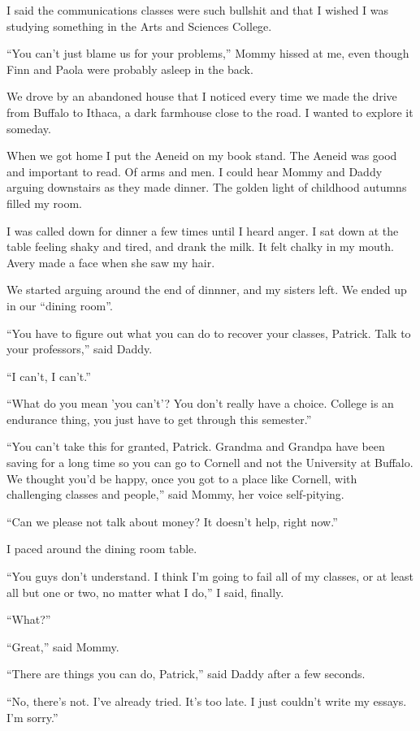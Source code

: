 I said the communications classes were such bullshit and that I wished I was
studying something in the Arts and Sciences College.  

``You can't just blame us for your problems,'' Mommy hissed at me, even though Finn
and Paola were probably asleep in the back.

We drove by an abandoned house that I noticed every time we made the drive from
Buffalo to Ithaca, a dark farmhouse close to the road.  I wanted to
explore it someday.

When we got home I put the Aeneid on my book stand.  The Aeneid was good and
important to read.  Of arms and men.  I could hear Mommy and Daddy arguing
downstairs as they made dinner.   The golden light of childhood autumns filled
my room.

I was called down for dinner a few times until I heard anger.  I sat down at the
table feeling shaky and tired, and drank the milk.  It felt chalky in my mouth.
Avery made a face when she saw my hair.

We started arguing around the end of dinnner, and my sisters left.  We ended up
in our ``dining room''.

``You have to figure out what you can do to recover your classes, Patrick.  Talk
to your professors,'' said Daddy.

``I can't, I can't.'' 

``What do you mean 'you can't'?  You don't really have a choice.  College is an
endurance thing, you just have to get through this semester.''

``You can't take this for granted, Patrick.  Grandma and Grandpa have been saving
for a long time so you can go to Cornell and not the University at Buffalo.  We
thought you'd be happy, once you got to a place like Cornell, with challenging
classes and people,'' said Mommy, her voice self-pitying.

``Can we please not talk about money?  It doesn't help, right now.''

I paced around the dining room table.

``You guys don't understand.  I think I'm going to fail all of my classes, or at
least all but one or two, no matter what I do,'' I said, finally.

``What?''

``Great,'' said Mommy.

``There are things you can do, Patrick,'' said Daddy after a few seconds.

``No, there's not.  I've already tried.  It's too late.  I just couldn't write my essays.  I'm
sorry.''

